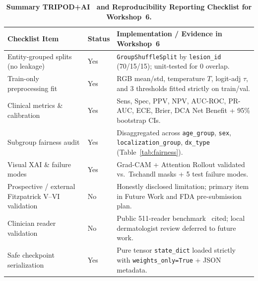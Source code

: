 \begin{table}[htbp]
\centering
\caption{\textbf{Summary TRIPOD+AI~\cite{Collins2024tripod} and Reproducibility Reporting Checklist for Workshop~6.}}
\label{tab:tripod_checklist}
\footnotesize
\begin{tabular}{p{3.6cm}p{1.6cm}p{9.0cm}}
\toprule
\textbf{Checklist Item} & \textbf{Status} & \textbf{Implementation / Evidence in Workshop~6} \\
\midrule
Entity-grouped splits (no leakage) & Yes & \texttt{GroupShuffleSplit} by \texttt{lesion\_id} (70/15/15); unit-tested for 0 overlap. \\
Train-only preprocessing fit & Yes & RGB mean/std, temperature $T$, logit-adj $\tau$, and 3 thresholds fitted strictly on train/val. \\
Clinical metrics \& calibration & Yes & Sens, Spec, PPV, NPV, AUC-ROC, PR-AUC, ECE, Brier, DCA Net Benefit + 95\% bootstrap CIs. \\
Subgroup fairness audit & Yes & Disaggregated across \texttt{age\_group}, \texttt{sex}, \texttt{localization\_group}, \texttt{dx\_type} (Table~\ref{tab:fairness}). \\
Visual XAI \& failure modes & Yes & Grad-CAM + Attention Rollout validated vs.\ Tschandl masks + 5 test failure modes. \\
Prospective / external Fitzpatrick V--VI validation & No & Honestly disclosed limitation; primary item in Future Work and FDA pre-submission plan. \\
Clinician reader validation & No & Public 511-reader benchmark~\cite{Tschandl2019comparison} cited; local dermatologist review deferred to future work. \\
Safe checkpoint serialization & Yes & Pure tensor \texttt{state\_dict} loaded strictly with \texttt{weights\_only=True} + JSON metadata. \\
\bottomrule
\end{tabular}
\end{table}
